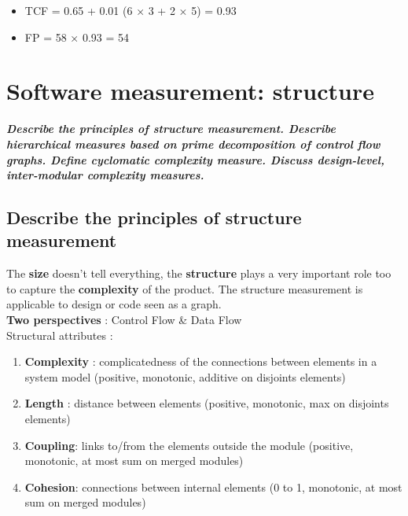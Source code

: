 \documentclass{article}
\begin{document}
\begin{multicols}{2}
\begin{itemize}
\begin{itemize}
    \item TCF
=
0.65
+
0.01
(6
× 3
+
2
× 5)
=
0.93
    \item FP
=
58
× 0.93
=
54
\end{itemize}
\end{itemize}
\end{multicols}

\newpage
\section{Software measurement: structure }
\textbf{\textit{Describe the principles of structure measurement. Describe hierarchical measures based on prime decomposition of control flow graphs. Define cyclomatic complexity measure.
Discuss design-level, inter-modular complexity measures.}}

\subsection{Describe the principles of structure measurement}

The \textbf{size} doesn't tell everything, the \textbf{structure} plays a very important role too to capture the \textbf{complexity}
of the product.
The structure measurement is applicable to design or code seen as a graph. \\

\noindent \textbf{Two perspectives} :  Control Flow \& Data Flow\\

\noindent Structural attributes : 
\begin{enumerate}
    \item \textbf{Complexity} : complicatedness of the connections between elements in a system model (positive, monotonic, additive on disjoints elements)
    \item \textbf{Length} : distance between elements (positive, monotonic, max on disjoints elements)
    \item \textbf{Coupling}: links to/from the elements outside the module (positive, monotonic, at most sum on merged modules)
    \item \textbf{Cohesion}: connections between internal elements (0 to 1, monotonic, at most sum on merged modules)
\end{enumerate}
\end{document}
